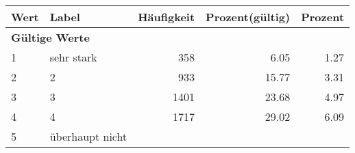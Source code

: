      \begin{longtable}{lXrrr}
     \toprule
     \textbf{Wert} & \textbf{Label} & \textbf{Häufigkeit} & \textbf{Prozent(gültig)} & \textbf{Prozent} \\
     \endhead
     \midrule
     \multicolumn{5}{l}{\textbf{Gültige Werte}}\\

     1 &
     \multicolumn{1}{X}{ sehr stark   } &


       \num{358} &
       \num[round-mode=places,round-precision=2]{6.05} &
         \num[round-mode=places,round-precision=2]{1.27} \\

     2 &
     \multicolumn{1}{X}{ 2   } &


       \num{933} &
       \num[round-mode=places,round-precision=2]{15.77} &
         \num[round-mode=places,round-precision=2]{3.31} \\

     3 &
     \multicolumn{1}{X}{ 3   } &


       \num{1401} &
       \num[round-mode=places,round-precision=2]{23.68} &
         \num[round-mode=places,round-precision=2]{4.97} \\

     4 &
     \multicolumn{1}{X}{ 4   } &


       \num{1717} &
       \num[round-mode=places,round-precision=2]{29.02} &
         \num[round-mode=places,round-precision=2]{6.09} \\

     5 &
     \multicolumn{1}{X}{ überhaupt nicht   } &



\end{longtable}
